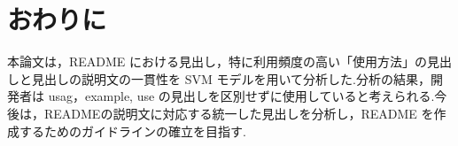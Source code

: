 \documentclass[uplatex,dvipdfmx,a4paper,twocolumn,base=11pt,jbase=11pt,ja=standard]{bxjsarticle}  %
\newcommand{\todo}[1]{\colorbox{yellow}{{\bf TODO}:}{\color{red} {\textbf{[#1]}}}}
\begin{document}






\section{おわりに}








本論文は，README における見出し，特に利用頻度の高い「使用方法」の見出しと見出しの説明文の一貫性を SVM モデルを用いて分析した.分析の結果，開発者は usag，example, use の見出しを区別せずに使用していると考えられる.今後は，READMEの説明文に対応する統一した見出しを分析し，README を作成するためのガイドラインの確立を目指す.
\end{document}

